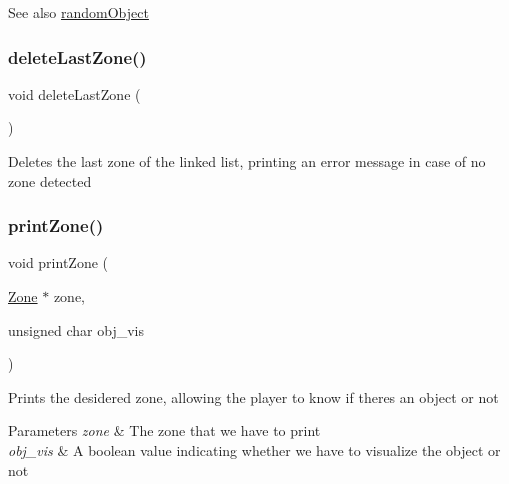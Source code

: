 \begin{DoxySeeAlso}{See also}
\hyperlink{group__map_ga14c46e63cc9c0b8cbc9b48efcde61609}{random\+Object} 
\end{DoxySeeAlso}
\mbox{\label{group__map_ga9200eca02abbb391411ab23fb57cf2c1}} 
\subsubsection{\texorpdfstring{delete\+Last\+Zone()}{deleteLastZone()}}
{\footnotesize\ttfamily void delete\+Last\+Zone (\begin{DoxyParamCaption}{ }\end{DoxyParamCaption})\hspace{0.3cm}{\ttfamily [static]}}

Deletes the last zone of the linked list, printing an error message in case of no zone detected \mbox{\label{group__map_ga821f387806e6d9f8581df4d9823bb3e3}} 
\subsubsection{\texorpdfstring{print\+Zone()}{printZone()}}
{\footnotesize\ttfamily void print\+Zone (\begin{DoxyParamCaption}\item[{\hyperlink{group__map_ga25bd5049e352284b30a6a239fa772249}{Zone} $\ast$}]{zone,  }\item[{unsigned char}]{obj\+\_\+vis }\end{DoxyParamCaption})\hspace{0.3cm}{\ttfamily [static]}}

Prints the desidered zone, allowing the player to know if there\textquotesingle{}s an object or not 
\begin{DoxyParams}{Parameters}
{\em zone} & The zone that we have to print \\
\hline
{\em obj\+\_\+vis} & A boolean value indicating whether we have to visualize the object or not \\
\hline
\end{DoxyParams}
\mbox{\label{group__map_ga2057afa3403f93d17b2de845f095ac4f}} 
